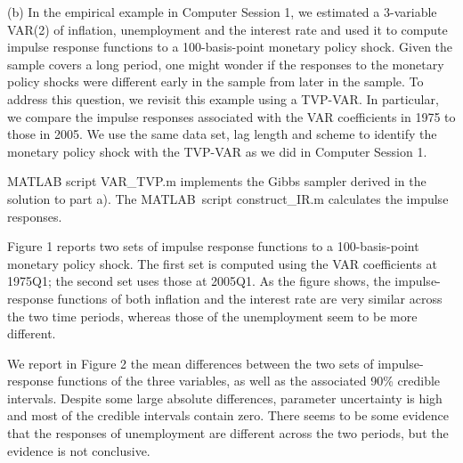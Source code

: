 \documentclass{article}
\begin{document}
(b) In the empirical example in Computer Session 1, we estimated a
3-variable VAR(2) of inflation, unemployment and the interest rate and used
it to compute impulse response functions to a 100-basis-point monetary
policy shock. Given the sample covers a long period, one might wonder if the
responses to the monetary policy shocks were different early in the sample
from later in the sample. To address this question, we revisit this example
using a TVP-VAR. In particular, we compare the impulse responses associated
with the VAR coefficients in 1975 to those in 2005. We use the same data
set, lag length and scheme to identify the monetary policy shock with the
TVP-VAR as we did in Computer Session 1.

MATLAB script VAR\_TVP.m implements the Gibbs sampler derived in the
solution to part a). The MATLAB\ script construct\_IR.m calculates the
impulse responses.

Figure 1 reports two sets of impulse response functions to a 100-basis-point
monetary policy shock. The first set is computed using the VAR coefficients
at 1975Q1; the second set uses those at 2005Q1. As the figure shows, the
impulse-response functions of both inflation and the interest rate are very
similar across the two time periods, whereas those of the unemployment seem
to be more different.


We report in Figure 2 the mean differences between the two sets of
impulse-response functions of the three variables, as well as the associated
90\% credible intervals. Despite some large absolute differences, parameter
uncertainty is high and most of the credible intervals contain zero. There
seems to be some evidence that the responses of unemployment are different
across the two periods, but the evidence is not conclusive.

\end{document}
